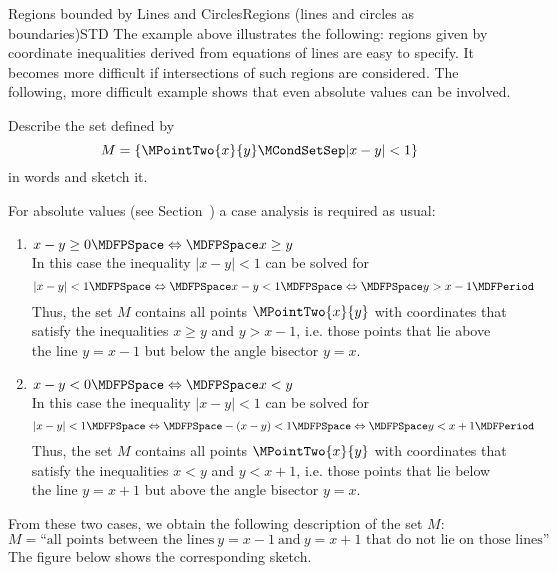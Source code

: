 \begin{MXContent}{Regions bounded by Lines and Circles}{Regions (lines and circles as boundaries)}{STD}
The example above illustrates the following: regions given by coordinate inequalities
derived from equations of lines are easy to specify. It becomes more difficult if intersections of 
such regions are considered. The following, more difficult example shows that even absolute values can be involved. 


\begin{MExample}
Describe the set defined by 
\[
 M=\{\MPointTwo{x}{y}\MCondSetSep |x-y|<1\}
\]
in words and sketch it.

For absolute values (see Section~) a case analysis is required as usual:
\begin{enumerate}
 \item $x-y\geq 0\MDFPSpace\Leftrightarrow\MDFPSpace x\geq y$\\
 In this case the inequality $|x-y|<1$ can be solved for
 \[
  |x-y|<1\MDFPSpace\Leftrightarrow\MDFPSpace x-y<1\MDFPSpace\Leftrightarrow\MDFPSpace y>x-1 \MDFPeriod
 \]
  Thus, the set $M$ contains all points $\MPointTwo{x}{y}$ with coordinates that satisfy the inequalities 
  $x\geq y$ and $y>x-1$, i.e. those points that lie above the line $y=x-1$ but below the angle bisector 
  $y=x$.
 \item $x-y< 0\MDFPSpace\Leftrightarrow\MDFPSpace x<y$\\
  In this case the inequality $|x-y|<1$ can be solved for
 \[
  |x-y|<1\MDFPSpace\Leftrightarrow\MDFPSpace -(x-y)<1\MDFPSpace\Leftrightarrow\MDFPSpace y<x+1 \MDFPeriod
 \]
  Thus, the set $M$ contains all points $\MPointTwo{x}{y}$ with coordinates that satisfy the inequalities 
  $x<y$ and $y<x+1$, i.e. those points that lie below the line $y=x+1$ but above the angle bisector $y=x$.
\end{enumerate}
From these two cases, we obtain the following description of the set $M$:
\[
 M=\textrm{``all points between the lines}\ y=x-1\ \textrm{and}\ y=x+1\textrm{ that do not lie on those lines''}
\]
The figure below shows the corresponding sketch.
\begin{center}
\end{center}
\end{MExample}
\end{MXContent}
